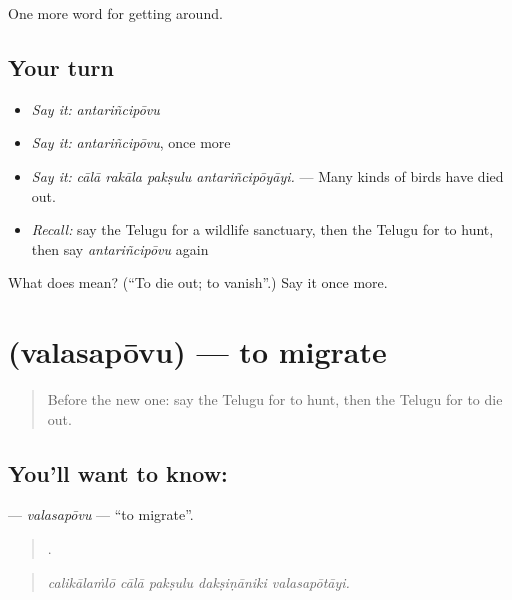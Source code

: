 \begin{grammarlens}[title={What you've built}]
One more word for getting around.
\end{grammarlens}

\subsection*{Your turn}
\begin{itemize}
\raggedright
  \item \emph{Say it:} \emph{antariñcipōvu}
  \item \emph{Say it:} \emph{antariñcipōvu}, once more
  \item \emph{Say it:} \emph{cālā rakāla pakṣulu antariñcipōyāyi.} — Many kinds of birds have died out.
  \item \emph{Recall:} say the Telugu for a wildlife sanctuary, then the Telugu for to hunt, then say \emph{antariñcipōvu} again
\end{itemize}

\begin{tcolorbox}[breakable,colback=teal!4,colframe=teal!35!black,title={Before you move on}]
What does  mean? (\textquotedblleft{}To die out; to vanish\textquotedblright{}.) Say it once more.
\end{tcolorbox}
\section[\texorpdfstring{\te{వలసపోవు} (valasapōvu)}{వలసపోవు (valasapōvu)}]{ (valasapōvu) — to migrate}

\label{lesson:TE-C472-valasapovu}



\begin{quote}
Before the new one: say the Telugu for to hunt, then the Telugu for to die out.
\end{quote}

\subsection*{You'll want to know: }
\textbf{} — \emph{valasapōvu} — \textquotedblleft{}to migrate\textquotedblright{}.

\begin{quote}
    .
\end{quote}

\begin{quote}
\emph{calikālaṁlō cālā pakṣulu dakṣiṇāniki valasapōtāyi.}
\end{quote}


